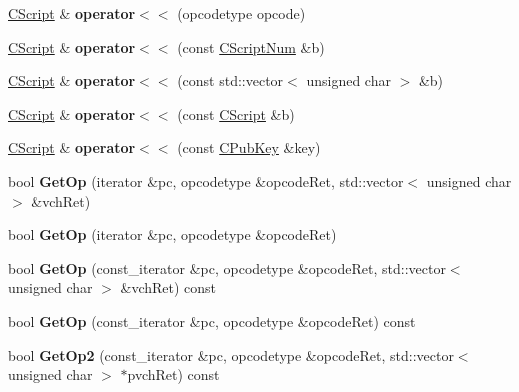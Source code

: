\begin{DoxyCompactItemize}
\mbox{\hyperlink{class_c_script}{C\+Script}} \& {\bfseries operator$<$$<$} (opcodetype opcode)
\item 
\mbox{\label{class_c_script_a3324c3ce4a32c0f76b45c791a039b6fd}} 
\mbox{\hyperlink{class_c_script}{C\+Script}} \& {\bfseries operator$<$$<$} (const \mbox{\hyperlink{class_c_script_num}{C\+Script\+Num}} \&b)
\item 
\mbox{\label{class_c_script_a6e58790e9f280dd7272ca0d81459b6ef}} 
\mbox{\hyperlink{class_c_script}{C\+Script}} \& {\bfseries operator$<$$<$} (const std\+::vector$<$ unsigned char $>$ \&b)
\item 
\mbox{\label{class_c_script_aa47d739da94465950b3977c04a49f089}} 
\mbox{\hyperlink{class_c_script}{C\+Script}} \& {\bfseries operator$<$$<$} (const \mbox{\hyperlink{class_c_script}{C\+Script}} \&b)
\item 
\mbox{\label{class_c_script_a90ca62e4cd7e8c6e90a397f42d6b0564}} 
\mbox{\hyperlink{class_c_script}{C\+Script}} \& {\bfseries operator$<$$<$} (const \mbox{\hyperlink{class_c_pub_key}{C\+Pub\+Key}} \&key)
\item 
\mbox{\label{class_c_script_a94635ed93d8d244ec3acfa83f9ecfe5f}} 
bool {\bfseries Get\+Op} (iterator \&pc, opcodetype \&opcode\+Ret, std\+::vector$<$ unsigned char $>$ \&vch\+Ret)
\item 
\mbox{\label{class_c_script_a913b6f84ecb7ae584200279fa0c064a9}} 
bool {\bfseries Get\+Op} (iterator \&pc, opcodetype \&opcode\+Ret)
\item 
\mbox{\label{class_c_script_ae07231780831ba57f723bd35e4572753}} 
bool {\bfseries Get\+Op} (const\+\_\+iterator \&pc, opcodetype \&opcode\+Ret, std\+::vector$<$ unsigned char $>$ \&vch\+Ret) const
\item 
\mbox{\label{class_c_script_aa292083a7d467b4991fd650fa42e333d}} 
bool {\bfseries Get\+Op} (const\+\_\+iterator \&pc, opcodetype \&opcode\+Ret) const
\item 
\mbox{\label{class_c_script_aac2dbe75742054049b0c6de0e9473ef0}} 
bool {\bfseries Get\+Op2} (const\+\_\+iterator \&pc, opcodetype \&opcode\+Ret, std\+::vector$<$ unsigned char $>$ $\ast$pvch\+Ret) const

\end{DoxyCompactItemize}
